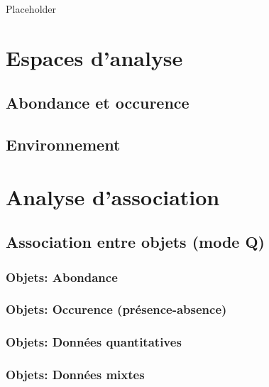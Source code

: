 \documentclass[]{book}
\begin{document}
Placeholder

\hypertarget{espaces-danalyse}{%
\section{Espaces d'analyse}\label{espaces-danalyse}}

\hypertarget{abondance-et-occurence}{%
\subsection{Abondance et occurence}\label{abondance-et-occurence}}

\hypertarget{environnement}{%
\subsection{Environnement}\label{environnement}}

\hypertarget{analyse-dassociation}{%
\section{Analyse d'association}\label{analyse-dassociation}}

\hypertarget{association-entre-objets-mode-q}{%
\subsection{Association entre objets (mode
Q)}\label{association-entre-objets-mode-q}}

\hypertarget{objets-abondance}{%
\subsubsection{Objets: Abondance}\label{objets-abondance}}

\hypertarget{objets-occurence-pruxe9sence-absence}{%
\subsubsection{Objets: Occurence
(présence-absence)}\label{objets-occurence-pruxe9sence-absence}}

\hypertarget{objets-donnuxe9es-quantitatives}{%
\subsubsection{Objets: Données
quantitatives}\label{objets-donnuxe9es-quantitatives}}

\hypertarget{objets-donnuxe9es-mixtes}{%
\subsubsection{Objets: Données mixtes}\label{objets-donnuxe9es-mixtes}}
\end{document}
